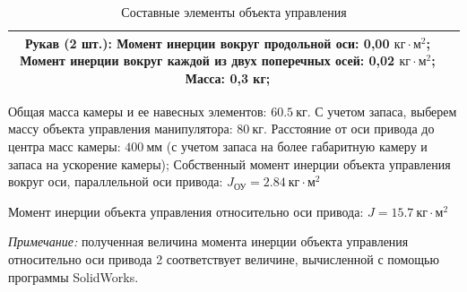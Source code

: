\begin{table}[h!]
\begin{tabular}{|c|c|}
            \shortstack[l]{\textbf{Рукав (2 шт.):}                                                          \\
                            Момент инерции вокруг продольной оси: 0,00 $\text{кг} \cdot \text{м}^{2}$;                    \\
                            Момент инерции вокруг каждой из двух поперечных  осей: 0,02 $\text{кг} \cdot \text{м}^{2}$;   \\
                            Масса: 0,3 кг;
                          }                                                                                         \\
        \hline
    \end{tabular}

    \caption{Составные элементы объекта управления}
\end{table}

Общая масса камеры и ее навесных элементов: $60.5 ~\text{кг}$. С учетом запаса, выберем
массу объекта управления манипулятора: $80 ~\text{кг}$.
Расстояние от оси привода до центра масс камеры: $400 ~\text{мм}$ (с учетом запаса
на более габаритную камеру и запаса на ускорение камеры);
Собственный момент инерции объекта управления вокруг оси, параллельной оси привода:
$ J_{\text{ОУ}} = 2.84 ~\text{кг} \cdot \text{м}^2 $

Момент инерции объекта управления относительно оси привода:
$ J = 15.7 ~\text{кг} \cdot \text{м}^2 $

\textit{Примечание:} полученная величина момента инерции объекта управления относительно оси привода 2 соответствует величине, вычисленной с помощью программы SolidWorks.




\endinput


